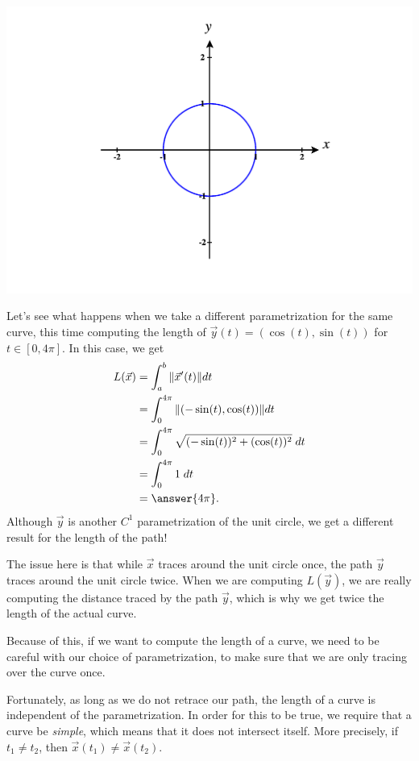 \documentclass{ximera}
\begin{document}
\begin{image}
\includegraphics[width = \textwidth]{CalcPlot3D-unit_circle}
\end{image}

Let's see what happens when we take a different parametrization for the same curve, this time computing the length of $\vec{y}(t) = (\cos(t),\sin(t))$ for $t\in[0,4\pi]$. In this case, we get
\begin{align*}
L(\vec{x}) &= \int_a^b\|\vec{x}'(t)\|dt\\
&= \int_{0}^{4\pi}\|(-\sin(t),\cos(t))\|dt\\
&= \int_{0}^{4\pi} \sqrt{(-\sin(t))^2 + (\cos(t))^2}\;dt\\
&= \int_{0}^{4\pi} 1\;dt\\
& = \answer{4\pi}.
\end{align*}
Although $\vec{y}$ is another $C^1$ parametrization of the unit circle, we get a different result for the length of the path!

The issue here is that while $\vec{x}$ traces around the unit circle once, the path $\vec{y}$ traces around the unit circle twice. When we are computing $L(\vec{y})$, we are really computing the distance traced by the path $\vec{y}$, which is why we get twice the length of the actual curve.

Because of this, if we want to compute the length of a curve, we need to be careful with our choice of parametrization, to make sure that we are only tracing over the curve once. 

Fortunately, as long as we do not retrace our path, the length of a curve is independent of the parametrization. In order for this to be true, we require that a curve be \emph{simple}, which means that it does not intersect itself. More precisely, if $t_1\neq t_2$, then $\vec{x}(t_1)\neq \vec{x}(t_2)$.
\end{document}
